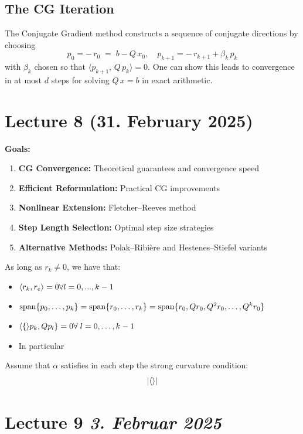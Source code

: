 \subsection*{The CG Iteration}
The Conjugate Gradient method constructs a sequence of conjugate directions by choosing
\[
  p_0 = -\,r_0 \;=\; b - Q\,x_0,
  \quad
  p_{k+1} = -\,r_{k+1} + \beta_k\,p_k
\]
with \(\beta_k\) chosen so that \(\langle p_{k+1},\,Q\,p_k\rangle=0\). One can show this leads to convergence in at most \(d\) steps for solving \(Q\,x = b\) in exact arithmetic.

\section{Lecture 8 (31. February 2025)}

\textbf{Goals:}
\begin{enumerate}
  \item \textbf{CG Convergence:} Theoretical guarantees and convergence speed
  \item \textbf{Efficient Reformulation:} Practical CG improvements
  \item \textbf{Nonlinear Extension:} Fletcher--Reeves method
  \item \textbf{Step Length Selection:} Optimal step size strategies
  \item \textbf{Alternative Methods:} Polak--Ribière and Hestenes--Stiefel variants
\end{enumerate}

\begin{theorem}{}{}
  As long as \(r_k \neq 0\), we have that:
  \begin{itemize}
    \item \(\langle r_k, r_e\rangle=0 \forall l = 0,...,k-1 \)
    \item \(\operatorname{span}\{p_0,\ldots, p_k\} = \operatorname{span}\{r_0, \ldots, r_k\} = \operatorname{span}\{r_0, Qr_0, Q^2r_0,\ldots, Q^k r_0\}\)
    \item \(\langle\{\rangle p_k, Qp_l\} = 0 \forall \; l=0,\ldots,k-1\)
    \item In particular
  \end{itemize}
\end{theorem}

\begin{lemma}{}{}
  Assume that \(\alpha\) satisfies in each step the strong curvature condition:
  \[
    \left|\langle\rangle\right|
  \]
\end{lemma}

\section{Lecture 9 \emph{3. Februar 2025}}

